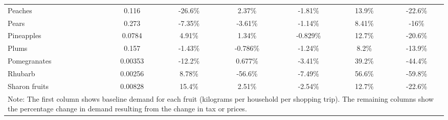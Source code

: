\documentclass[11pt]{article}
\begin{document}
\begin{table}[h]
\begin{center}
{\begin{tabular}{lcccccc}
\hline
Peaches &0.116 &-26.6\% &2.37\% &-1.81\% &13.9\% &-22.6\% \\
Pears &0.273 &-7.35\% &-3.61\% &-1.14\% &8.41\% &-16\% \\
Pineapples &0.0784 &4.91\% &1.34\% &-0.829\% &12.7\% &-20.6\% \\
Plums &0.157 &-1.43\% &-0.786\% &-1.24\% &8.2\% &-13.9\% \\
Pomegranates &0.00353 &-12.2\% &0.677\% &-3.41\% &39.2\% &-44.4\% \\
\hline
Rhubarb &0.00256 &8.78\% &-56.6\% &-7.49\% &56.6\% &-59.8\% \\
Sharon fruits &0.00828 &15.4\% &2.51\% &-2.54\% &12.7\% &-22.6\% \\
 \hline \hline
\multicolumn{7}{p{1.0 \textwidth}}{Note: The first column shows baseline demand for each fruit (kilograms per household per shopping trip). The remaining columns show the percentage change in demand resulting from the change in tax or prices.}
\end{tabular}}
\end{center}
\end{table}
\end{document}

